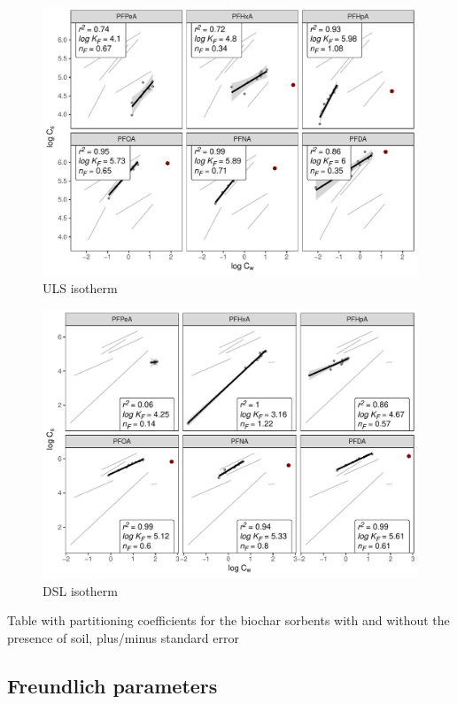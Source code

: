 \begin{figure}
    \centering
    \includegraphics[width=\textwidth]{R/figs/ULS_facet_isotherm.pdf}
    \caption{ULS isotherm}
    \label{fig:ULS_isotherm}
\end{figure}

\begin{figure}
    \centering
    \includegraphics[width=\textwidth]{R/figs/DSL_facet_isotherm.pdf}
    \caption{DSL isotherm}
    \label{fig:DSL_isotherm}
\end{figure}

Table with partitioning coefficients for the biochar sorbents with and without the presence of soil, plus/minus standard error

\subsection{Freundlich parameters}

